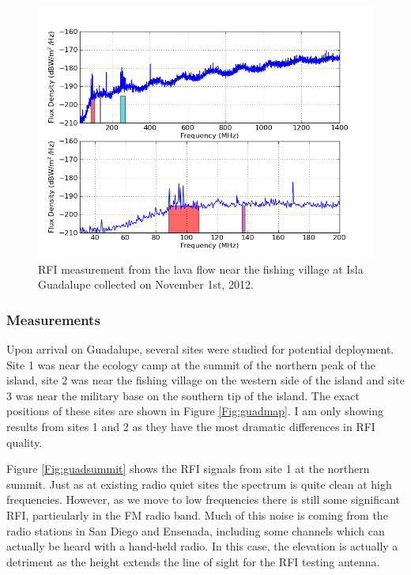 \begin{figure}[htb]
\begin{center}
\includegraphics[width=0.9\linewidth]{RFI_testing/figures/GI_2__bands.png}
\caption{RFI measurement from the lava flow near the fishing village at Isla Guadalupe collected on November 1st, 2012.}
\label{Fig:guadlow}
\end{center}
\end{figure}

\subsubsection{Measurements}

Upon arrival on Guadalupe, several sites were studied for potential deployment. Site 1 was near the ecology camp at the summit of the northern peak of the island, site 2 was near the fishing village on the western side of the island and site 3 was near the military base on the southern tip of the island. The exact positions of these sites are shown in Figure \ref{Fig:guadmap}. I am only showing results from sites 1 and 2 as they have the most dramatic differences in RFI quality. 

Figure \ref{Fig:guadsummit} shows the RFI signals from site 1 at the northern summit. Just as at existing radio quiet sites the spectrum is quite clean at high frequencies. However, as we move to low frequencies there is still some significant RFI, particularly in the FM radio band. Much of this noise is coming from the radio stations in San Diego and Ensenada, including some channels which can actually be heard with a hand-held radio. In this case, the elevation is actually a detriment as the height extends the line of sight for the RFI testing antenna. 

